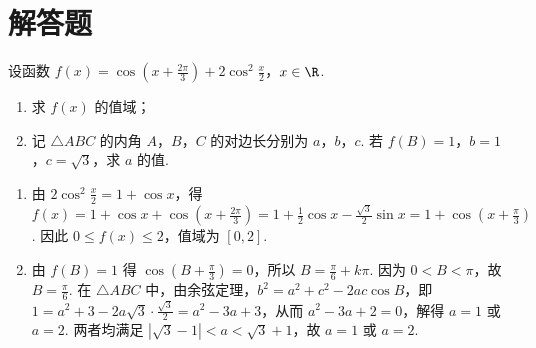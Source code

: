 \section{解答题}

\begin{problem}
设函数 \(f(x) = \cos \left(x + \frac{2\pi}{3}\right) + 2\cos^2 \frac{x}{2}\)，\(x \in \R\).

\begin{enumerate}
\item 求 \( f(x) \) 的值域；
\item 记 \(\triangle ABC\) 的内角 \(A\)，\(B\)，\(C\) 的对边长分别为 \(a\)，\(b\)，\(c\). 若 \(f(B) = 1\)，\(b = 1\)，\(c = \sqrt{3}\)，求 \(a\) 的值.
\end{enumerate}

\begin{solution}
\begin{enumerate}
\item 由 \(2\cos^2\frac{x}{2}=1+\cos x\)，得 \(f(x)=1+\cos x+\cos\left(x+\frac{2\pi}{3}\right)=1+\frac{1}{2}\cos x-\frac{\sqrt{3}}{2}\sin x=1+\cos\left(x+\frac{\pi}{3}\right)\). 因此 \(0\leqslant f(x)\leqslant2\)，值域为 \([0,2]\).
\item 由 \(f(B)=1\) 得 \(\cos\left(B+\frac{\pi}{3}\right)=0\)，所以 \(B=\frac{\pi}{6}+k\pi\). 因为 \(0<B<\pi\)，故 \(B=\frac{\pi}{6}\). 在 \(\triangle ABC\) 中，由余弦定理，\(b^2=a^2+c^2-2ac\cos B\)，即 \(1=a^2+3-2a\sqrt{3}\cdot\frac{\sqrt{3}}{2}=a^2-3a+3\)，从而 \(a^2-3a+2=0\)，解得 \(a=1\) 或 \(a=2\). 两者均满足 \(|\sqrt{3}-1|<a<\sqrt{3}+1\)，故 \(a=1\) 或 \(a=2\).
\end{enumerate}
\end{solution}
\end{problem}


